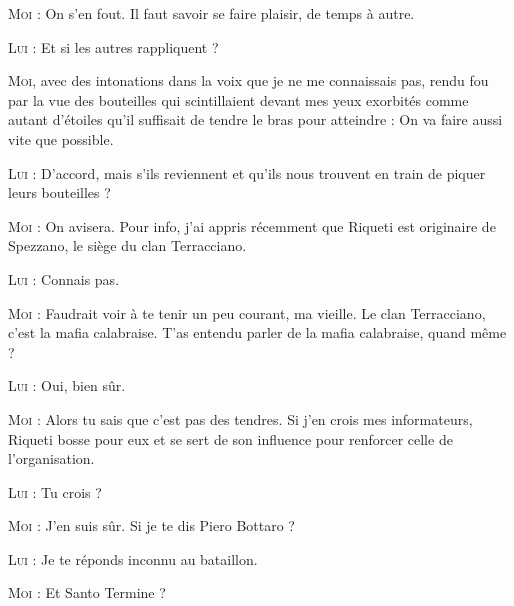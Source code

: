 \begin{dialogue}
\textsc{Moi} : On s’en fout. Il faut savoir se faire plaisir, de temps à autre.

\textsc{Lui} : Et si les autres rappliquent ?

\textsc{Moi}, avec des intonations dans la voix que je ne me connaissais pas, rendu fou par la vue des bouteilles qui scintillaient devant mes yeux exorbités comme autant d’étoiles qu’il suffisait de tendre le bras pour atteindre : On va faire aussi vite que possible.

\textsc{Lui} : D’accord, mais s’ils reviennent et qu’ils nous trouvent en train de piquer leurs bouteilles ?

\textsc{Moi} : On avisera. Pour info, j’ai appris récemment que Riqueti est originaire de Spezzano, le siège du clan Terracciano.

\textsc{Lui} : Connais pas.

\textsc{Moi} : Faudrait voir à te tenir un peu courant, ma vieille. Le clan Terracciano, c’est la mafia calabraise. T’as entendu parler de la mafia calabraise, quand même ?

\textsc{Lui} : Oui, bien sûr.

\textsc{Moi} : Alors tu sais que c’est pas des tendres. Si j’en crois mes informateurs, Riqueti bosse pour eux et se sert de son influence pour renforcer celle de l’organisation.

\textsc{Lui} : Tu crois ?

\textsc{Moi} : J’en suis sûr. Si je te dis Piero Bottaro ?

\textsc{Lui} : Je te réponds inconnu au bataillon.

\textsc{Moi} : Et Santo Termine ?


\end{dialogue}
